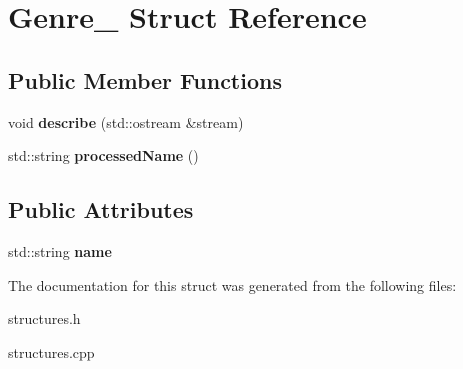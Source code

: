 \hypertarget{struct_genre__}{}\section{Genre\+\_\+ Struct Reference}
\label{struct_genre__}
\subsection*{Public Member Functions}
\begin{DoxyCompactItemize}
\item 
void {\bfseries describe} (std\+::ostream \&stream)\hypertarget{struct_genre___ae7e9b06d07dc4f2704f8e0d474a20edd}{}\label{struct_genre___ae7e9b06d07dc4f2704f8e0d474a20edd}

\item 
std\+::string {\bfseries processed\+Name} ()\hypertarget{struct_genre___aba8a3eaddd8d7fd2d0da9ff7f83801fa}{}\label{struct_genre___aba8a3eaddd8d7fd2d0da9ff7f83801fa}

\end{DoxyCompactItemize}
\subsection*{Public Attributes}
\begin{DoxyCompactItemize}
\item 
std\+::string {\bfseries name}\hypertarget{struct_genre___a8e89d3d7f0c279d298dbfec867b38f14}{}\label{struct_genre___a8e89d3d7f0c279d298dbfec867b38f14}

\end{DoxyCompactItemize}


The documentation for this struct was generated from the following files\+:\begin{DoxyCompactItemize}
\item 
structures.\+h\item 
structures.\+cpp\end{DoxyCompactItemize}

